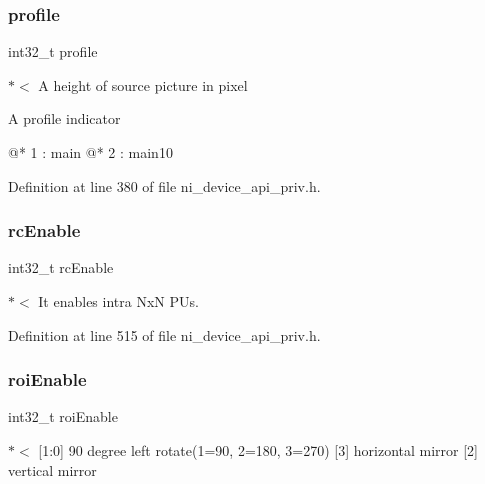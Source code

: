 \subsubsection{\texorpdfstring{profile}{profile}}
{\footnotesize\ttfamily int32\+\_\+t profile}

$\ast$$<$ A height of source picture in pixel


\begin{DoxyItemize}
\item \begin{DoxyVerb}A profile indicator

@* 1 : main
@* 2 : main10
\end{DoxyVerb}
 
\end{DoxyItemize}

Definition at line 380 of file ni\+\_\+device\+\_\+api\+\_\+priv.\+h.

\mbox{\label{struct__ni__encoder__change__params__t_af3132dc82b1751b641e6b3d024055122}} 
\subsubsection{\texorpdfstring{rcEnable}{rcEnable}}
{\footnotesize\ttfamily int32\+\_\+t rc\+Enable}

$\ast$$<$ It enables intra NxN P\+Us. 

Definition at line 515 of file ni\+\_\+device\+\_\+api\+\_\+priv.\+h.

\mbox{\label{struct__ni__encoder__change__params__t_af75c3567740c6fbc3baa8c4c72fd0df7}} 
\subsubsection{\texorpdfstring{roiEnable}{roiEnable}}
{\footnotesize\ttfamily int32\+\_\+t roi\+Enable}

$\ast$$<$ \mbox{[}1\+:0\mbox{]} 90 degree left rotate(1=90\textquotesingle{}, 2=180\textquotesingle{}, 3=270\textquotesingle{}) \mbox{[}3\mbox{]} horizontal mirror \mbox{[}2\mbox{]} vertical mirror 

